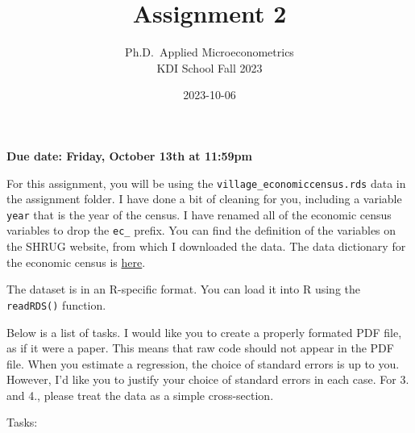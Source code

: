 \documentclass[
]{article}
\title{Assignment 2}
\subtitle{Ph.D.~Applied Microeconometrics\\
KDI School Fall 2023}
\author{}
\date{\vspace{-2.5em}2023-10-06}
\begin{document}
\maketitle

\textbf{Due date: Friday, October 13th at 11:59pm}

For this assignment, you will be using the \texttt{village\_economiccensus.rds} data in the assignment folder. I have done a bit of cleaning for you, including a variable \texttt{year} that is the year of the census. I have renamed all of the economic census variables to drop the \texttt{ec\_} prefix. You can find the definition of the variables on the SHRUG website, from which I downloaded the data. The data dictionary for the economic census is \href{https://docs.devdatalab.org/SHRUG-Metadata/Economic\%20Census/Tables/ec90-metadata/}{\textcolor{kdisgreen}{here}}.

The dataset is in an R-specific format. You can load it into R using the \texttt{readRDS()} function.

Below is a list of tasks. I would like you to create a properly formated PDF file, as if it were a paper. This means that raw code should not appear in the PDF file. When you estimate a regression, the choice of standard errors is up to you. However, I'd like you to justify your choice of standard errors in each case. For 3. and 4., please treat the data as a simple cross-section.

Tasks:
\end{document}
